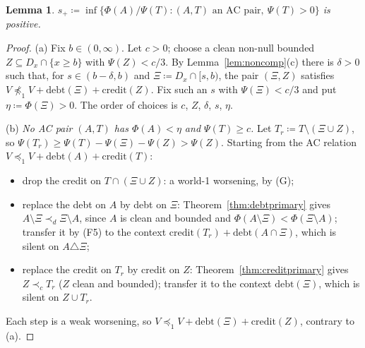 \documentclass[11pt]{article}
\newtheorem{lemma}[theorem]{Lemma}
\theoremstyle{definition}\newtheorem{definition}[theorem]{Definition}
\theoremstyle{remark}\newtheorem{remark}[theorem]{Remark}
\newcommand{\debt}{\mathrm{debt}}
\newcommand{\cred}{\mathrm{credit}}
\newcommand{\Band}{\Xi}
\begin{document}
\begin{lemma}\label{lem:splus}
$s_+\coloneqq\inf\{\Phi(A)/\Psi(T):(A,T)\text{ an AC pair},\ \Psi(T)>0\}$ is
positive.
\end{lemma}
\begin{proof}
(a) Fix $b\in(0,\infty)$. Let $c>0$; choose a clean non-null bounded
$Z\subseteq D_x\cap\{x\ge b\}$ with $\Psi(Z)<c/3$. By
Lemma~\ref{lem:noncomp}(c) there is $\delta>0$ such that, for
$s\in(b-\delta,b)$ and $\Band\coloneqq D_x\cap[s,b)$, the pair $(\Band,Z)$
satisfies $V\not\preceq_1V+\debt(\Band)+\cred(Z)$. Fix such an $s$ with
$\Psi(\Band)<c/3$ and put $\eta\coloneqq\Phi(\Band)>0$. The order of choices
is $c$, $Z$, $\delta$, $s$, $\eta$.

(b) \emph{No AC pair $(A,T)$ has $\Phi(A)<\eta$ and $\Psi(T)\ge c$.} Let
$T_r\coloneqq T\setminus(\Band\cup Z)$, so $\Psi(T_r)\ge
\Psi(T)-\Psi(\Band)-\Psi(Z)>\Psi(Z)$. Starting from the AC relation
$V\preceq_1V+\debt(A)+\cred(T)$:
\begin{itemize}[leftmargin=*,itemsep=1pt]
\item drop the credit on $T\cap(\Band\cup Z)$: a world-1 worsening, by (G);
\item replace the debt on $A$ by debt on $\Band$: Theorem~\ref{thm:debtprimary}
gives $A\setminus\Band\prec_d\Band\setminus A$, since $A$ is clean and
bounded and $\Phi(A\setminus\Band)<\Phi(\Band\setminus A)$; transfer it by
(F5) to the context $\cred(T_r)+\debt(A\cap\Band)$, which is silent on
$A\triangle\Band$;
\item replace the credit on $T_r$ by credit on $Z$: Theorem~\ref{thm:creditprimary}
gives $Z\prec_cT_r$ ($Z$ clean and bounded); transfer it to the context
$\debt(\Band)$, which is silent on $Z\cup T_r$.
\end{itemize}
Each step is a weak worsening, so $V\preceq_1V+\debt(\Band)+\cred(Z)$,
contrary to (a).


\end{proof}
\end{document}

